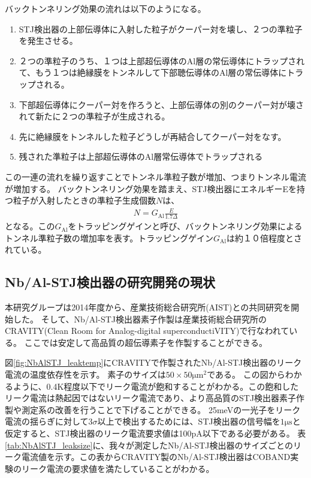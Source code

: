 \begin{description}
				バックトンネリング効果の流れは以下のようになる。
				\begin{enumerate}
					\item STJ検出器の上部伝導体に入射した粒子がクーパー対を壊し、２つの準粒子を発生させる。
					\item ２つの準粒子のうち、１つは上部超伝導体のAl層の常伝導体にトラップされて、もう１つは絶縁膜をトンネルして下部聴伝導体のAl層の常伝導体にトラップされる。
					\item 下部超伝導体にクーパー対を作ろうと、上部伝導体の別のクーパー対が壊されて新たに２つの準粒子が生成される。
					\item 先に絶縁膜をトンネルした粒子どうしが再結合してクーパー対をなす。
					\item 残された準粒子は上部超伝導体のAl層常伝導体でトラップされる
				\end{enumerate}
				この一連の流れを繰り返すことでトンネル準粒子数が増加、つまりトンネル電流が増加する。
				バックトンネリング効果を踏まえ、STJ検出器にエネルギーEを持つ粒子が入射したときの準粒子生成個数$N$は、
				\begin{eqnarray}
					N = G_{\mathrm{Al}} \frac{E}{1.7 \Delta}
				\end{eqnarray}
				となる。この$G_{\mathrm{Al}}$をトラッピングゲインと呼び、バックトンネリング効果によるトンネル準粒子数の増加率を表す。トラッピングゲイン$G_{\mathrm{Al}}$は約１０倍程度とされている。
		\end{description}

	\subsection{Nb/Al-STJ検出器の研究開発の現状}
		本研究グループは2014年度から、産業技術総合研究所(AIST)との共同研究を開始した。
		そして、Nb/Al-STJ検出器素子作製は産業技術総合研究所のCRAVITY(Clean Room for Analog-digital superconductiVITY)で行なわれている。
		ここでは安定して高品質の超伝導素子を作製することができる。
		
		図\ref{fig:NbAlSTJ_leaktemp}にCRAVITYで作製されたNb/Al-STJ検出器のリーク電流の温度依存性を示す。
		素子のサイズは$50 \times 50 \mathrm{{\mu m}^2}$である。
		この図からわかるように、0.4K程度以下でリーク電流が飽和することがわかる。この飽和したリーク電流は熱起因ではないリーク電流であり、より高品質のSTJ検出器素子作製や測定系の改善を行うことで下げることができる。
		25meVの一光子をリーク電流の揺らぎに対して$3 \sigma$以上で検出するためには、STJ検出器の信号幅を$1 \mathrm{\mu s}$と仮定すると、STJ検出器のリーク電流要求値は100pA以下である必要がある。
		表\ref{tab:NbAlSTJ_leaksize}に、我々が測定したNb/Al-STJ検出器のサイズごとのリーク電流値を示す。この表からCRAVITY製のNb/Al-STJ検出器はCOBAND実験のリーク電流の要求値を満たしていることがわかる。
		
